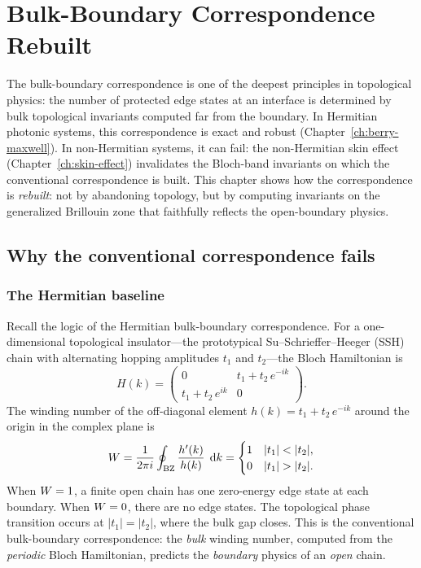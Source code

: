 \chapter{Bulk-Boundary Correspondence Rebuilt}
\label{ch:bbc-rebuilt}

\begin{chapterlead}
The bulk-boundary correspondence is one of the deepest principles in
topological physics: the number of protected edge states at an interface
is determined by bulk topological invariants computed far from the
boundary. In Hermitian photonic systems, this correspondence is exact
and robust (Chapter~\ref{ch:berry-maxwell}). In non-Hermitian systems,
it can fail: the non-Hermitian skin effect
(Chapter~\ref{ch:skin-effect}) invalidates the Bloch-band invariants on
which the conventional correspondence is built. This chapter shows how
the correspondence is \emph{rebuilt}: not by abandoning topology, but by
computing invariants on the generalized Brillouin zone that faithfully
reflects the open-boundary physics.
\end{chapterlead}


\section{Why the conventional correspondence fails}
\label{sec:bbc-failure}

\subsection{The Hermitian baseline}
\label{ssec:hermitian-baseline}

Recall the logic of the Hermitian bulk-boundary correspondence.
For a one-dimensional topological insulator---the prototypical Su--Schrieffer--Heeger (SSH) chain with alternating hopping amplitudes
$t_1$ and $t_2$---the Bloch Hamiltonian is
\begin{equation}
 H(k) = \begin{pmatrix} 0 & t_1 + t_2\,e^{-ik} \\
 t_1 + t_2\,e^{ik} & 0 \end{pmatrix}.
 \label{eq:ssh-bloch}
\end{equation}
The winding number of the off-diagonal element $h(k) = t_1 + t_2\,e^{-ik}$
around the origin in the complex plane is
\begin{equation}
 W = \frac{1}{2\pi i}\oint_{\mathrm{BZ}}
 \frac{h'(k)}{h(k)}\;\mathop{}\!\mathrm{d} k
 = \begin{cases} 1 & |t_1| < |t_2|, \\ 0 & |t_1| > |t_2|. \end{cases}
 \label{eq:ssh-winding}
\end{equation}
When $W = 1$, a finite open chain has one zero-energy edge state at
each boundary. When $W = 0$, there are no edge states. The
topological phase transition occurs at $|t_1| = |t_2|$, where the bulk
gap closes. This is the conventional bulk-boundary correspondence:
the \emph{bulk} winding number, computed from the \emph{periodic}
Bloch Hamiltonian, predicts the \emph{boundary} physics of an
\emph{open} chain.

